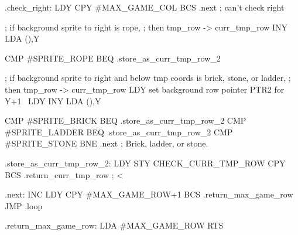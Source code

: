 \documentclass[10pt]{report}%
\begin{document}
.check_right:
    LDY     
    CPY     #MAX_GAME_COL
    BCS     .next           ; can't check right

    ; if background sprite to right is rope,
    ; then tmp_row -> curr_tmp_row
    INY
    LDA     (),Y

    CMP     #SPRITE_ROPE
    BEQ     .store_as_curr_tmp_row_2

    ; if background sprite to right and below tmp coords is brick, stone, or ladder,
    ; then tmp_row -> curr_tmp_row
    LDY     
    \LA{}set background row pointer \code{}PTR2\edoc{} for \code{}Y+1\edoc{}~{\nwtagstyle{}}\RA{}
    LDY     
    INY
    LDA     (),Y

    CMP     #SPRITE_BRICK
    BEQ     .store_as_curr_tmp_row_2
    CMP     #SPRITE_LADDER
    BEQ     .store_as_curr_tmp_row_2
    CMP     #SPRITE_STONE
    BNE     .next
    ; Brick, ladder, or stone.

.store_as_curr_tmp_row_2:
    LDY     
    STY     CHECK_CURR_TMP_ROW
    CPY     
    BCS     .return_curr_tmp_row
    ;  < 

.next:
    INC     
    LDY     
    CPY     #MAX_GAME_ROW+1
    BCS     .return_max_game_row
    JMP     .loop

.return_max_game_row:
    LDA     #MAX_GAME_ROW
    RTS
\end{document}
